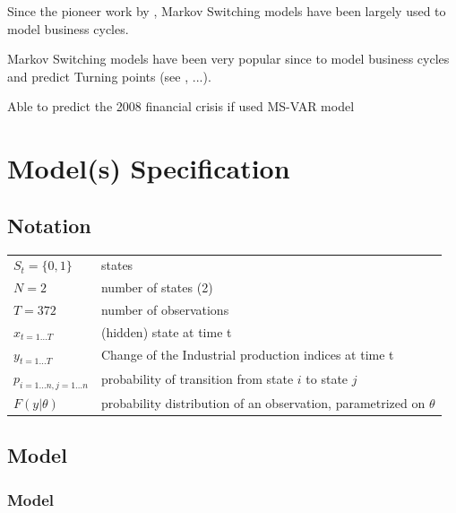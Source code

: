 \documentclass[12pt,a4paper,oneside]{book}
\begin{document}
Since the pioneer work by \cite{hamilton_new_1989}, Markov Switching models have been largely used to model business cycles.


Markov Switching models have been very popular since \cite{hamilton_new_1989} to model business cycles and predict Turning points (see \cite{duprey_how_2017}, ...).

Able to predict the 2008 financial crisis if used MS-VAR model \cite{gadea_rivas_failure_2015}




\section{Model(s) Specification}

\subsection{Notation}

\begin{tabular}{l l}
    $S_t = \{0, 1\}$&   states        \\
    $N = 2$         &   number of states (2) \\
    $T = 372 $            & 	number of observations  \\
    $x_{t=1\dots T}$ & (hidden) state at time t \\
    $y_{t=1\dots T}$ 	& Change of the Industrial production indices at time t \\
    $p_{i=1\dots n,j=1\dots n}$ & probability of transition from state $i$ to state $j$ \\
    $F(y|\theta )$	&  probability distribution of an observation, parametrized on $\theta$ \\
\end{tabular}



\subsection{Model}

\subsubsection{Model}



\end{document}
